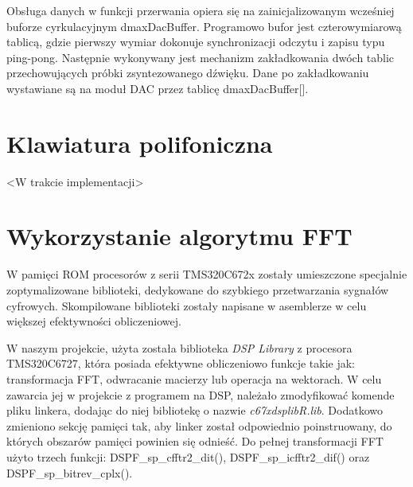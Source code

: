 Obsługa danych w funkcji przerwania opiera się na zainicjalizowanym wcześniej buforze cyrkulacyjnym dmaxDacBuffer. Programowo bufor jest czterowymiarową tablicą, gdzie pierwszy wymiar dokonuje synchronizacji odczytu i zapisu typu ping-pong. Następnie wykonywany jest mechanizm zakładkowania dwóch tablic przechowujących próbki zsyntezowanego dźwięku. Dane po zakładkowaniu wystawiane są na moduł DAC przez tablicę dmaxDacBuffer[].

\section{Klawiatura polifoniczna}
<W trakcie implementacji>



\section{Wykorzystanie algorytmu FFT}


W pamięci ROM procesorów z serii TMS320C672x zostały umieszczone specjalnie zoptymalizowane biblioteki, dedykowane do szybkiego przetwarzania sygnałów cyfrowych. Skompilowane biblioteki zostały napisane w asemblerze w celu większej efektywności obliczeniowej. 

W naszym projekcie, użyta została biblioteka \emph{DSP Library} z procesora TMS320C6727, która posiada efektywne obliczeniowo funkcje takie jak: transformacja FFT, odwracanie macierzy lub operacja na wektorach. W celu zawarcia jej w projekcie z programem na DSP, należało zmodyfikować komende pliku linkera, dodając do niej bibliotekę o nazwie \emph{c67xdsplibR.lib}. Dodatkowo zmieniono sekcję pamięci tak, aby linker został odpowiednio poinstruowany, do których obszarów pamięci powinien się odnieść. Do pełnej transformacji FFT użyto trzech funkcji: DSPF\_sp\_cfftr2\_dit(), DSPF\_sp\_icfftr2\_dif() oraz DSPF\_sp\_bitrev\_cplx().

